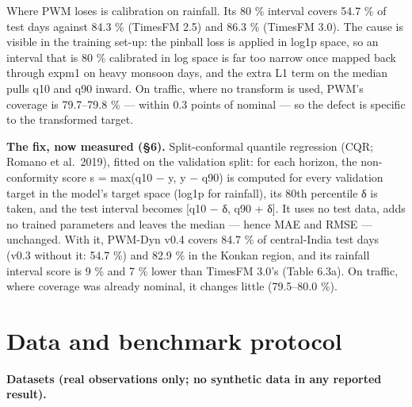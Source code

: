 \documentclass[
  10pt,
]{article}
\begin{document}
Where PWM loses is calibration on rainfall. Its 80 \% interval covers
54.7 \% of test days against 84.3 \% (TimesFM 2.5) and 86.3 \% (TimesFM
3.0). The cause is visible in the training set-up: the pinball loss is
applied in log1p space, so an interval that is 80 \% calibrated in log
space is far too narrow once mapped back through expm1 on heavy monsoon
days, and the extra L1 term on the median pulls q10 and q90 inward. On
traffic, where no transform is used, PWM's coverage is 79.7--79.8 \% ---
within 0.3 points of nominal --- so the defect is specific to the
transformed target.

\textbf{The fix, now measured (§6).} Split-conformal quantile regression
(CQR; Romano et al.~2019), fitted on the validation split: for each
horizon, the non-conformity score s = max(q10 − y, y − q90) is computed
for every validation target in the model's target space (log1p for
rainfall), its 80th percentile δ is taken, and the test interval becomes
{[}q10 − δ, q90 + δ{]}. It uses no test data, adds no trained parameters
and leaves the median --- hence MAE and RMSE --- unchanged. With it,
PWM-Dyn v0.4 covers 84.7 \% of central-India test days (v0.3 without it:
54.7 \%) and 82.9 \% in the Konkan region, and its rainfall interval
score is 9 \% and 7 \% lower than TimesFM 3.0's (Table 6.3a). On
traffic, where coverage was already nominal, it changes little
(79.5--80.0 \%).

\section{Data and benchmark protocol}

\textbf{Datasets (real observations only; no synthetic data in any
reported result).}
\end{document}
